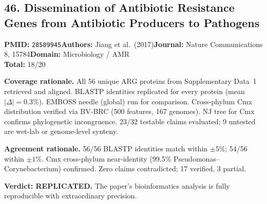 \subsection{46. Dissemination of Antibiotic Resistance Genes from Antibiotic Producers to Pathogens}
\textbf{PMID:} \texttt{28589945}\quad\textbf{Authors:} Jiang et al.\ (2017)\quad\textbf{Journal:} Nature Communications 8, 15784\quad\textbf{Domain:} Microbiology / AMR\\
\quad{}\quad\textbf{Total:} 18/20\par\smallskip
\noindent\textbf{Coverage rationale.} All 56 unique ARG proteins from Supplementary Data~1 retrieved and aligned. BLASTP identities replicated for every protein (mean $|\Delta|=0.3\%$). EMBOSS needle (global) run for comparison. Cross-phylum Cmx distribution verified via BV-BRC (500 features, 167 genomes). NJ tree for Cmx confirms phylogenetic incongruence. 23/32 testable claims evaluated; 9 untested are wet-lab or genome-level synteny.\par
\noindent\textbf{Agreement rationale.} 56/56 BLASTP identities match within $\pm 5\%$; 54/56 within $\pm 1\%$. Cmx cross-phylum near-identity (99.5\% Pseudomonas--Corynebacterium) confirmed. Zero claims contradicted; 17 verified, 3 partial.\par\smallskip
\noindent\textbf{Verdict: REPLICATED.} The paper's bioinformatics analysis is fully reproducible with extraordinary precision.

